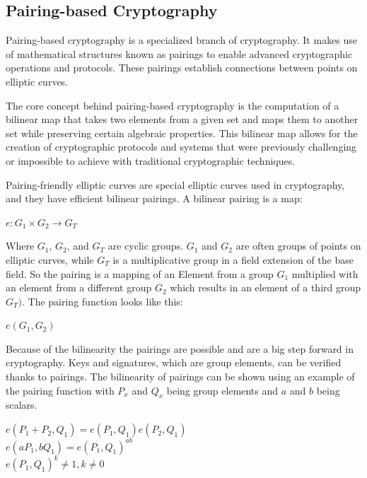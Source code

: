 \documentclass{article}
\begin{document}
\subsection{Pairing-based Cryptography}

Pairing-based cryptography is a specialized branch of cryptography. It makes use of mathematical structures known as pairings to enable advanced cryptographic operations and protocols. These pairings establish connections between points on elliptic curves.

The core concept behind pairing-based cryptography is the computation of a bilinear map that takes two elements from a given set and maps them to another set while preserving certain algebraic properties. This bilinear map allows for the creation of cryptographic protocols and systems that were previously challenging or impossible to achieve with traditional cryptographic techniques.

Pairing-friendly elliptic curves are special elliptic curves used in cryptography, and they have efficient bilinear pairings. A bilinear pairing is a map:
\begin{center}
\(e:G_1\times G_2 \xrightarrow{} G_T\)
\end{center}
Where \(G_1\), \(G_2\), and \(G_T\) are cyclic groups. \(G_1\) and \(G_2\) are often groups of points on elliptic curves, while \(G_T\) is a multiplicative group in a field extension of the base field. So the pairing is a mapping of an Element from a group \(G_1\) multiplied with an element from a different group \(G_2\) which results in an element of a third group \(G_T)\). The pairing function looks like this: \\
\begin{center}
    \(e(G_1, G_2)\)
\end{center}

Because of the bilinearity the pairings are possible and are a big step forward in cryptography. Keys and signatures, which are group elements, can be verified thanks to pairings. The bilinearity of pairings can be shown using an example of the pairing function with \(P_x\) and \(Q_x\) being group elements and \(a\) and \(b\) being scalars.
\begin{center}
    \(e(P_1 + P_2, Q_1) = e(P_1, Q_1) e(P_2, Q_1)\)\\
    \(e(aP_1, bQ_1) = e(P_1, Q_1)^{ab}\)\\
    \(e(P_1, Q_1)^k \neq 1, k \neq 0\) \\
    
\end{center}
\end{document}
